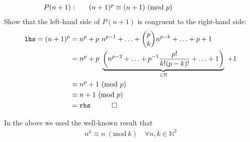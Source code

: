 \documentclass[12pt]{article}
\newcommand{\modulo}[1]{~(\mathrm{mod}~#1)}
\begin{document}
\begin{align*}
\mathllap{P(n+1): \hspace{2em}}
  (n+1)^{p}\equiv (n+1)\modulo{p}
\end{align*}
Show that the left-hand side of $P(n+1)$ is congruent to the right-hand side:
\begin{align*}
\texttt{lhs} 
  = (n+1)^{p}
  & = n^{p} + p\ n^{p-1} + \ldots + \binom{p}{k} n^{p-k}  + \ldots + p + 1 \\
  & = n^{p} + p ~\underbrace{\left(n^{p-2} + \ldots + p^{-1}\frac{p!}{k!(p-k)!} + \ldots + 1\right)}_{\in\mathbb{N}}~ +1 \\
  & \equiv n^{p} + 1 \modulo{p} \\
  & \equiv n + 1 \modulo{p} \\
  & = \texttt{rhs} \mathrlap{\quad \qed}
\end{align*}

In the above we used the well-known result that
\begin{align*}
  n^{k} \equiv n \modulo{k} \quad \forall n,k\in\mathbb{N}^{2}
\end{align*}
\end{document}
